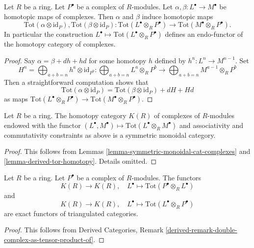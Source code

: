 \begin{lemma}
\label{lemma-derived-tor-homotopy}
Let $R$ be a ring. Let $P^\bullet$ be a complex of $R$-modules.
Let $\alpha, \beta : L^\bullet \to M^\bullet$ be homotopic
maps of complexes. Then $\alpha$ and $\beta$ induce homotopic maps
$$
\text{Tot}(\alpha \otimes \text{id}_P),
\text{Tot}(\beta \otimes \text{id}_P) :
\text{Tot}(L^\bullet \otimes_R P^\bullet)
\longrightarrow
\text{Tot}(M^\bullet \otimes_R P^\bullet).
$$
In particular the construction
$L^\bullet \mapsto \text{Tot}(L^\bullet \otimes_R P^\bullet)$
defines an endo-functor of the homotopy category of complexes.
\end{lemma}

\begin{proof}
Say $\alpha = \beta + dh + hd$ for some homotopy $h$ defined by
$h^n : L^n \to M^{n - 1}$. Set
$$
H^n = \bigoplus\nolimits_{a + b = n} h^a \otimes \text{id}_{P^b} :
\bigoplus\nolimits_{a + b = n} L^a \otimes_R P^b
\longrightarrow
\bigoplus\nolimits_{a + b = n} M^{a - 1} \otimes_R P^b
$$
Then a straightforward computation shows that
$$
\text{Tot}(\alpha \otimes \text{id}_P) =
\text{Tot}(\beta \otimes \text{id}_P) + dH + Hd
$$
as maps $\text{Tot}(L^\bullet \otimes_R P^\bullet) \to
\text{Tot}(M^\bullet \otimes_R P^\bullet)$.
\end{proof}

\begin{lemma}
\label{lemma-symmetric-monoidal-homotopy-category}
Let $R$ be a ring. The homotopy category $K(R)$ of complexes of $R$-modules
endowed with the functor
$(L^\bullet, M^\bullet) \mapsto \text{Tot}(L^\bullet \otimes_R M^\bullet)$
and associativity and commutativity constraints as above is a symmetric
monoidal category.
\end{lemma}

\begin{proof}
This follows from Lemmas \ref{lemma-symmetric-monoidal-cat-complexes} and
\ref{lemma-derived-tor-homotopy}. Details omitted.
\end{proof}

\begin{lemma}
\label{lemma-derived-tor-exact}
Let $R$ be a ring. Let $P^\bullet$ be a complex of $R$-modules.
The functors
$$
K(R) \longrightarrow K(R), \quad
L^\bullet \longmapsto \text{Tot}(P^\bullet \otimes_R L^\bullet)
$$
and
$$
K(R) \longrightarrow K(R), \quad
L^\bullet \longmapsto \text{Tot}(L^\bullet \otimes_R P^\bullet)
$$
are exact functors of triangulated categories.
\end{lemma}

\begin{proof}
This follows from Derived Categories, Remark
\ref{derived-remark-double-complex-as-tensor-product-of}.
\end{proof}





